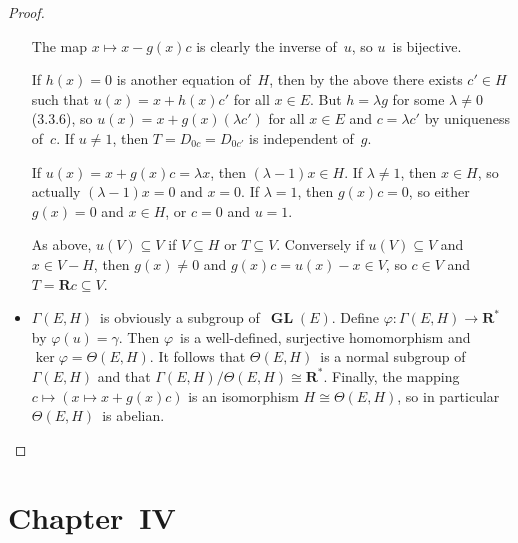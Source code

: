 \documentclass[letterpaper,12pt]{article}
\newcommand{\R}{\mathbf{R}}
\newcommand{\Rnz}{\R^*}
\newcommand{\iso}{\cong}
\DeclareMathOperator{\GL}{\mathbf{GL}}
\theoremstyle{definition}
\theoremstyle{remark}
\begin{document}
\begin{proof}
\begin{itemize}[itemsep=0pt]
The map \(x\mapsto x-g(x)c\) is clearly the inverse of~\(u\), so \(u\)~is bijective.

If \(h(x)=0\) is another equation of~\(H\), then by the above there exists \(c'\in H\) such that \(u(x)=x+h(x)c'\) for all \(x\in E\). But \(h=\lambda g\) for some \(\lambda\ne 0\) (3.3.6), so \(u(x)=x+g(x)(\lambda c')\) for all \(x\in E\) and \(c=\lambda c'\) by uniqueness of~\(c\). If \(u\ne 1\), then \(T=D_{0c}=D_{0c'}\) is independent of~\(g\).

If \(u(x)=x+g(x)c=\lambda x\), then \((\lambda-1)x\in H\). If \(\lambda\ne 1\), then \(x\in H\), so actually \((\lambda-1)x=0\) and \(x=0\). If \(\lambda=1\), then \(g(x)c=0\), so either \(g(x)=0\) and \(x\in H\), or \(c=0\) and \(u=1\).

As above, \(u(V)\subseteq V\) if \(V\subseteq H\) or \(T\subseteq V\). Conversely if \(u(V)\subseteq V\) and \(x\in V-H\), then \(g(x)\ne 0\) and \(g(x)c=u(x)-x\in V\), so \(c\in V\) and \(T=\R c\subseteq V\).\qedhere

\item \(\Gamma(E,H)\)~is obviously a subgroup of~\(\GL(E)\). Define \(\varphi:\Gamma(E,H)\to\Rnz\) by \(\varphi(u)=\gamma\). Then \(\varphi\)~is a well-defined, surjective homomorphism and \(\ker\varphi=\Theta(E,H)\). It follows that \(\Theta(E,H)\)~is a normal subgroup of~\(\Gamma(E,H)\) and that \(\Gamma(E,H)/\Theta(E,H)\iso\Rnz\). Finally, the mapping \(c\mapsto(x\mapsto x+g(x)c)\) is an isomorphism \(H\iso\Theta(E,H)\), so in particular \(\Theta(E,H)\)~is abelian.
\end{itemize}
\end{proof}

\section*{Chapter~IV}
\end{document}
